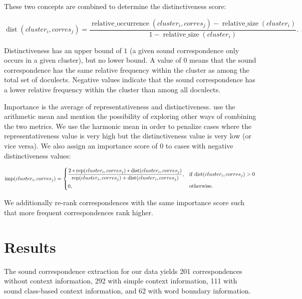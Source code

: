 \documentclass[a4paper]{article}
\begin{document}
These two concepts are combined to determine the distinctiveness score:

\begin{equation*}
\operatorname{dist}(cluster_i, corres_j) = 
\frac{\operatorname{relative\_occurrence}(cluster_i, corres_j) - \operatorname{relative\_size}(cluster_i)}
{1 - \operatorname{relative\_size}(cluster_i)}
.
\end{equation*}

Distinctiveness has an upper bound of
$1$ (a given sound correspondence only occurs in a given cluster),
but no lower bound.
A value of $0$ means that the sound correspondence
has the same relative frequency within the cluster
as among the total set of doculects.
Negative values indicate that the sound correspondence
has a lower relative frequency within the cluster
than among all doculects.

Importance is the average of representativeness and distinctiveness.
\citet{wieling2011bipartite} use the arithmetic mean
and mention the possibility of exploring
other ways of combining the two metrics.
We use the harmonic mean in order to penalize cases
where the representativeness value is very high
but the distinctiveness value is very low (or vice versa).
We also assign an importance score of $0$ to
cases with negative distinctiveness values:

\begin{equation*}
\operatorname{imp}(cluster_i, corres_j) = 
\begin{dcases}
\frac{
2 * \operatorname{rep}(cluster_i, corres_j) * \operatorname{dist}(cluster_i, corres_j)}
{\operatorname{rep}(cluster_i, corres_j) + \operatorname{dist}(cluster_i, corres_j)}, & \text{if dist}(cluster_i, corres_j) > 0\\
0, & \text{otherwise}.
\end{dcases}
\end{equation*}

We additionally re-rank correspondences
with the same importance score
such that more frequent correspondences rank higher.

\section{Results}
\label{sec:results}

The sound correspondence extraction for our data
yields 201 correspondences without context information,
292 with simple context information,
111 with sound class-based context information,
and 62 with word boundary information.
\end{document}
